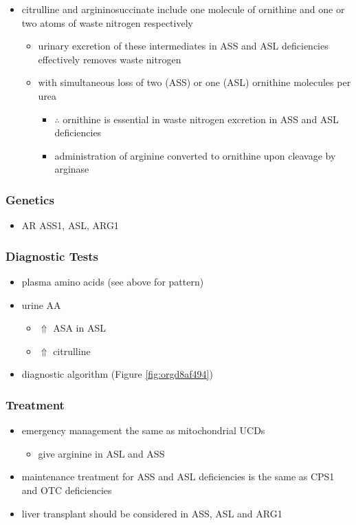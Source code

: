 \documentclass[12pt]{scrartcl}
\begin{document}
\begin{center}
\begin{center}
\begin{itemize}
\item citrulline and argininosuccinate include one molecule of ornithine
and one or two atoms of waste nitrogen respectively
\begin{itemize}
\item urinary excretion of these intermediates in ASS and ASL
deficiencies effectively removes waste nitrogen
\item with simultaneous loss of two (ASS) or one (ASL) ornithine
molecules per urea
\begin{itemize}
\item \(\therefore\) ornithine is essential in waste nitrogen excretion in
ASS and ASL deficiencies
\item administration of arginine converted to ornithine upon cleavage by arginase
\end{itemize}
\end{itemize}
\end{itemize}

\subsubsection{Genetics}
\label{sec:org54706a3}
\begin{itemize}
\item AR ASS1, ASL, ARG1
\end{itemize}

\subsubsection{Diagnostic Tests}
\label{sec:orgcffca98}
\begin{itemize}
\item plasma amino acids (see above for pattern)
\item urine AA
\begin{itemize}
\item \(\Uparrow\) ASA in ASL
\item \(\Uparrow\) citrulline
\end{itemize}
\item diagnostic algorithm (Figure \ref{fig:orgd8af494})
\end{itemize}

\subsubsection{Treatment}
\label{sec:org653790d}
\begin{itemize}
\item emergency management the same as mitochondrial UCDs
\begin{itemize}
\item give arginine in ASL and ASS
\end{itemize}
\item maintenance treatment for ASS and ASL deficiencies is the same as
CPS1 and OTC deficiencies
\item liver transplant should be considered in ASS, ASL and ARG1
\end{itemize}


\end{center}
\end{center}
\end{document}

